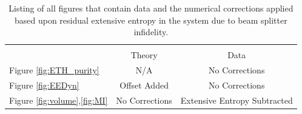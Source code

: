 \begin{table}[t]
	\small
	\begin{center}
		\begin{tabular}{l*{2}{c}}
			\hline
			\\
			& Theory & Data \\
			\hline
			Figure \ref{fig:ETH_purity} & N/A & No Corrections \\
			Figure \ref{fig:EEDyn} & Offset Added & No Corrections \\
			Figure \ref{fig:volume},\ref{fig:MI} & No Corrections & Extensive Entropy Subtracted \\
			\hline
		\end{tabular}
		\caption{\label{tab:Corrections} Listing of all figures that contain data and the numerical corrections applied based upon residual extensive entropy in the system due to beam splitter infidelity.}
	\end{center}
\end{table}


